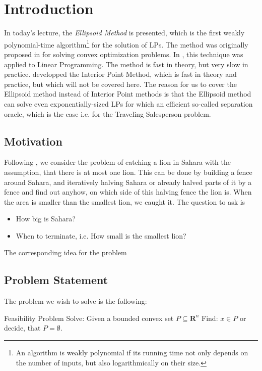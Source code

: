 \documentclass[10pt]{article}
\newcommand{\R}{\mathbf{R}}
\begin{document}


\section{Introduction}
In today's lecture, the \emph{Ellipsoid Method} is presented, which is the first weakly polynomial-time algorithm\footnote{An algorithm is weakly polynomial if its running time not only depends on the number of inputs, but also logarithmically on their size.} for the solution of LPs. The method was originally proposed in \cite{shor77} for solving convex optimization problems. In \cite{khachiyan79}, this technique was applied to Linear Programming. The method is fast in theory, but very slow in practice. \cite{karmarkar89} developped the Interior Point Method, which is fast in theory and practice, but which will not be covered here. The reason for us to cover the Ellipsoid method instead of Interior Point methods is that the Ellipsoid method can solve even exponentially-sized LPs for which an efficient so-called separation oracle, which is the case i.e. for the Traveling Salesperson problem. 

\subsection{Motivation}
Following \cite{lovaszschrijver}, we consider the problem of catching a lion in Sahara with the assumption, that there is at most one lion. This can be done by building a fence around Sahara, and iteratively halving Sahara or already halved parts of it by a fence and find out anyhow, on which side of this halving fence the lion is. When the area is smaller than the smallest lion, we caught it. The question to ask is
\begin{itemize}
\item How big is Sahara?
\item When to terminate, i.e. How small is the smallest lion?
\end{itemize}
The corresponding idea for the problem 
\subsection{Problem Statement}
The problem we wish to solve is the following:

Feasibility Problem
Solve: Given a bounded convex set $P\subseteq \R^n$
Find: $x \in P$ or decide, that $P = \emptyset$.
\end{document}
